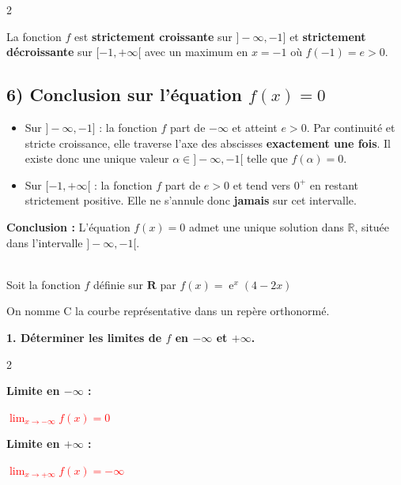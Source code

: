 \documentclass[11pt,a4paper]{article}
\DeclareMathOperator{\e}{e}
\begin{document}
\begin{tcolorbox}[colback=red!5!white,colframe=red!75!black]
\begin{multicols}{2}
\vspace{0.5cm}

La fonction $f$ est \textbf{strictement croissante} sur $]-\infty, -1]$ et \textbf{strictement décroissante} sur $[-1, +\infty[$ avec un maximum en $x = -1$ où $f(-1) = e > 0$.

\subsection*{6) Conclusion sur l'équation $f(x) = 0$}

\begin{itemize}
\item Sur $]-\infty, -1]$ : la fonction $f$ part de $-\infty$ et atteint $e > 0$. Par continuité et stricte croissance, elle traverse l'axe des abscisses \textbf{exactement une fois}. Il existe donc une unique valeur $\alpha \in ]-\infty, -1[$ telle que $f(\alpha) = 0$.

\item Sur $[-1, +\infty[$ : la fonction $f$ part de $e > 0$ et tend vers $0^+$ en restant strictement positive. Elle ne s'annule donc \textbf{jamais} sur cet intervalle.
\end{itemize}


\textbf{Conclusion :} L'équation $f(x) = 0$ admet une unique solution dans $\mathbb{R}$, située dans l'intervalle $]-\infty, -1[$.
\end{multicols}
\end{tcolorbox}

\vfill 

\newpage


\\ [5 pt]
Soit la fonction $f$ définie sur $\mathbf{R}$ par $f(x)=\e^x(4-2x)$

On nomme C la courbe représentative dans un repère orthonormé.

\textbf{1. Déterminer les limites de $f$ en $-\infty$ et  $+\infty$.}

\begin{tcolorbox}[colback=red!5!white,colframe=red!75!black]
\begin{multicols}{2}
{

\begin{center}

\textbf{Limite en $-\infty$ :}


\textbf{\textcolor{red}{$\displaystyle \lim_{x \to -\infty} f(x) = 0$}}

\columnbreak

\textbf{Limite en $+\infty$ :}


\textbf{\textcolor{red}{$\displaystyle \lim_{x \to +\infty} f(x) = -\infty$}}

\end{center}
}
\end{multicols}
\end{tcolorbox}
\end{document}
